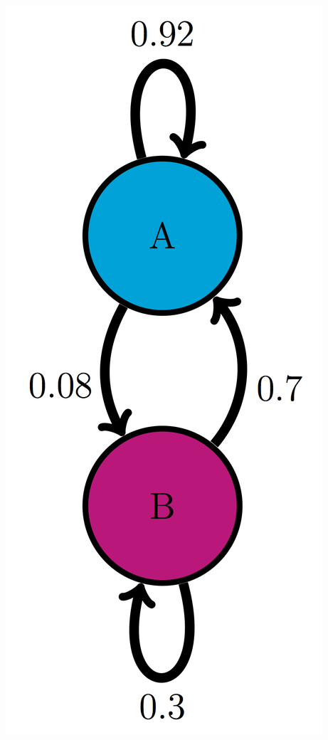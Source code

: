 \documentclass[
]{book}
\theoremstyle{definition}
\theoremstyle{definition}
\theoremstyle{definition}
\theoremstyle{remark}
\begin{document}
\includegraphics{ch10/AB_trans_diag.png}
\end{document}
